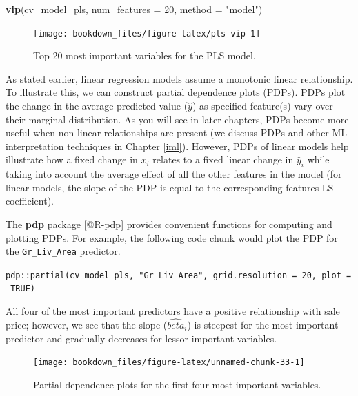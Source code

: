 \documentclass[]{krantz}
\makeatletter
\newenvironment{Shaded}{\begin{snugshade}}{\end{snugshade}}
\newcommand{\DataTypeTok}[1]{\textcolor[rgb]{0.27,0.27,0.27}{#1}}
\newcommand{\DecValTok}[1]{\textcolor[rgb]{0.06,0.06,0.06}{#1}}
\newcommand{\KeywordTok}[1]{\textcolor[rgb]{0.27,0.27,0.27}{\textbf{#1}}}
\newcommand{\NormalTok}[1]{#1}
\newcommand{\StringTok}[1]{\textcolor[rgb]{0.5,0.5,0.5}{#1}}
\newenvironment{kframe}{%
\medskip{}
\setlength{\fboxsep}{.8em}
 \def\at@end@of@kframe{}%
 \ifinner\ifhmode%
  \def\at@end@of@kframe{\end{minipage}}%
  \begin{minipage}{\columnwidth}%
 \fi\fi%
 \def\FrameCommand##1{\hskip\@totalleftmargin \hskip-\fboxsep
 \colorbox{shadecolor}{##1}\hskip-\fboxsep
     \hskip-\linewidth \hskip-\@totalleftmargin \hskip\columnwidth}%
 \MakeFramed {\advance\hsize-\width
   \@totalleftmargin\z@ \linewidth\hsize
   \@setminipage}}%
 {\par\unskip\endMakeFramed%
 \at@end@of@kframe}
\newenvironment{block}[1]
  {
  \begin{itemize}
  \renewcommand{\labelitemi}{
    \raisebox{-.7\height}[0pt][0pt]{
      {\setkeys{Gin}{width=3em,keepaspectratio}\texttt{[image: icons/\#1]}}
    }
  }
  \setlength{\fboxsep}{1em}
  \begin{kframe}
  \item
  }
  {
  \end{kframe}
  \end{itemize}
  }
\newenvironment{tip}
  {\begin{block}{tip}}
  {\end{block}}
\renewenvironment{Shaded}{\begin{kframe}}{\end{kframe}}
\makeatother
\begin{document}
\begin{Shaded}
\begin{Highlighting}[]
\KeywordTok{vip}\NormalTok{(cv_model_pls, }\DataTypeTok{num_features =} \DecValTok{20}\NormalTok{, }\DataTypeTok{method =} \StringTok{"model"}\NormalTok{)}
\end{Highlighting}
\end{Shaded}

\begin{figure}

{\centering \texttt{[image: bookdown\_files/figure-latex/pls-vip-1]} 

}

\caption{Top 20 most important variables for the PLS model.}\label{fig:pls-vip}
\end{figure}

As stated earlier, linear regression models assume a monotonic linear relationship. To illustrate this, we can construct partial dependence plots (PDPs). PDPs plot the change in the average predicted value (\(\widehat{y}\)) as specified feature(s) vary over their marginal distribution. As you will see in later chapters, PDPs become more useful when non-linear relationships are present (we discuss PDPs and other ML interpretation techniques in Chapter \ref{iml}). However, PDPs of linear models help illustrate how a fixed change in \(x_i\) relates to a fixed linear change in \(\widehat{y}_i\) while taking into account the average effect of all the other features in the model (for linear models, the slope of the PDP is equal to the corresponding features LS coefficient).

\begin{tip}
The \textbf{pdp} package {[}@R-pdp{]} provides convenient functions for
computing and plotting PDPs. For example, the following code chunk would
plot the PDP for the \texttt{Gr\_Liv\_Area} predictor.

\texttt{pdp::partial(cv\_model\_pls,\ "Gr\_Liv\_Area",\ grid.resolution\ =\ 20,\ plot\ =\ TRUE)}
\end{tip}

All four of the most important predictors have a positive relationship with sale price; however, we see that the slope (\(\widehat{beta}_i\)) is steepest for the most important predictor and gradually decreases for lessor important variables.

\begin{figure}

{\centering \texttt{[image: bookdown\_files/figure-latex/unnamed-chunk-33-1]} 

}

\caption{Partial dependence plots for the first four most important variables.}\label{fig:unnamed-chunk-33}
\end{figure}
\end{document}
